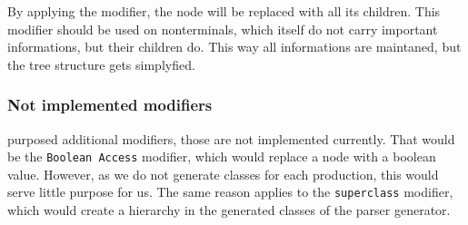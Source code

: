 By applying the modifier, the node will be replaced with all its children. This modifier should be used on nonterminals, which itself do not carry important informations, but their children do. This way all informations are maintaned, but the tree structure gets simplyfied.

\subsubsection{Not implemented modifiers}

\cite{GeneratingRewritableAST} purposed additional modifiers, those are not implemented currently. That would be the \verb|Boolean Access| modifier, which would replace a node with a boolean value. However, as we do not generate classes for each production, this would serve little purpose for us. The same reason applies to the \verb|superclass| modifier, which would create a hierarchy in the generated classes of the parser generator.
